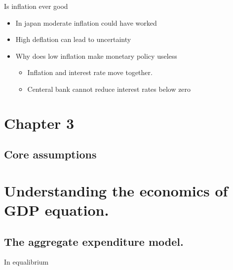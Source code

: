\documentclass[twocolumn]{article}
\providecommand{\tightlist}{%
  \setlength{\itemsep}{0pt}\setlength{\parskip}{0pt}}
\begin{document}
Is inflation ever good

\begin{itemize}
\tightlist
\item
  In japan moderate inflation could have worked
\item
  High deflation can lead to uncertainty
\item
  Why does low inflation make monetary policy useless

  \begin{itemize}
  \tightlist
  \item
    Inflation and interest rate move together.
  \item
    Centeral bank cannot reduce interest rates below zero
  \end{itemize}
\end{itemize}

\hypertarget{chapter-3}{%
\section{Chapter 3}\label{chapter-3}}

\hypertarget{core-assumptions}{%
\subsection{Core assumptions}\label{core-assumptions}}

\hypertarget{section}{%
\subsection{}\label{section}}

\hypertarget{understanding-the-economics-of-gdp-equation.}{%
\section{Understanding the economics of GDP
equation.}\label{understanding-the-economics-of-gdp-equation.}}

\hypertarget{the-aggregate-expenditure-model.}{%
\subsection{The aggregate expenditure
model.}\label{the-aggregate-expenditure-model.}}

In equalibrium
\end{document}
